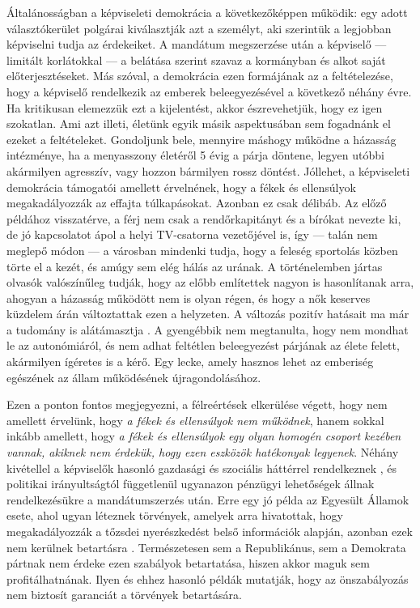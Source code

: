 Általánosságban a képviseleti demokrácia a következőképpen működik: egy adott
választókerület polgárai kiválasztják azt a személyt, aki szerintük a legjobban képviselni
tudja az érdekeiket. A mandátum megszerzése után a képviselő --- limitált korlátokkal ---
a belátása szerint szavaz a kormányban és alkot saját előterjesztéseket. Más szóval,
a demokrácia ezen formájának az a feltételezése, hogy a képviselő rendelkezik az emberek
beleegyezésével a következő néhány évre. Ha kritikusan elemezzük ezt a kijelentést,
akkor észrevehetjük, hogy ez igen szokatlan. Ami azt illeti, életünk egyik másik
aspektusában sem fogadnánk el ezeket a feltételeket. Gondoljunk bele, mennyire máshogy
működne a házasság intézménye, ha a menyasszony életéről 5 évig a párja döntene,
legyen utóbbi akármilyen agresszív, vagy hozzon bármilyen rossz döntést. Jóllehet,
a képviseleti demokrácia támogatói amellett érvelnének, hogy a fékek és ellensúlyok
megakadályozzák az effajta túlkapásokat. Azonban ez csak délibáb. Az előző példához
visszatérve, a férj nem csak a rendőrkapitányt és a bírókat nevezte ki, de jó
kapcsolatot ápol a helyi TV-csatorna vezetőjével is, így --- talán nem meglepő módon ---
a városban mindenki tudja, hogy a feleség sportolás közben törte el a kezét, és amúgy
sem elég hálás az urának. A történelemben jártas olvasók valószínűleg tudják, hogy az előbb
említettek nagyon is hasonlítanak arra, ahogyan a házasság működött nem is olyan régen,
és hogy a nők keserves küzdelem árán változtattak ezen a helyzeten. A változás pozitív
hatásait ma már a tudomány is alátámasztja \cite{divorce}. A gyengébbik nem megtanulta,
hogy nem mondhat le az autonómiáról, és nem adhat feltétlen beleegyezést párjának az
élete felett, akármilyen ígéretes is a kérő. Egy lecke, amely hasznos lehet az emberiség
egészének az állam működésének újragondolásához.

Ezen a ponton fontos megjegyezni, a félreértések elkerülése végett, hogy nem amellett
érvelünk, hogy \textit{a fékek és ellensúlyok nem működnek}, hanem sokkal inkább amellett,
hogy \textit{a fékek és ellensúlyok egy olyan homogén csoport kezében vannak, akiknek nem
érdekük, hogy ezen eszközök hatékonyak legyenek}.  Néhány kivétellel a képviselők
hasonló gazdasági és szociális háttérrel rendelkeznek \cite{reps_are_homogen_1,
reps_are_homogen_2}, és politikai irányultságtól függetlenül ugyanazon pénzügyi
lehetőségek állnak rendelkezésükre a mandátumszerzés után. Erre egy jó példa az Egyesült
Államok esete, ahol ugyan léteznek törvények, amelyek arra hivatottak, hogy megakadályozzák
a tőzsdei nyerészkedést belső információk alapján, azonban ezek nem kerülnek betartásra
\cite{insider_trading}. Természetesen sem a Republikánus, sem a Demokrata pártnak nem érdeke
ezen szabályok betartatása, hiszen akkor maguk sem profitálhatnának. Ilyen és ehhez hasonló
példák mutatják, hogy az önszabályozás nem biztosít garanciát a törvények betartására.

